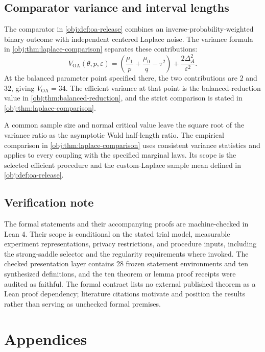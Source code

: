 \documentclass[11pt]{article}
\begin{document}
\subsection{Comparator variance and interval lengths}

The comparator in \cref{obj:def:oa-release} combines an inverse-probability-weighted binary outcome with independent centered Laplace noise. The variance formula in \cref{obj:thm:laplace-comparison} separates these contributions:
\[
V_{\mathrm{OA}}(\theta,p,\varepsilon)
=
\left(\frac{\mu_1}{p}+\frac{\mu_0}{q}-\tau^2\right)
+
\frac{2\Delta_A^2}{\varepsilon^2}.
\]
At the balanced parameter point specified there, the two contributions are \(2\) and \(32\), giving \(V_{\mathrm{OA}}=34\). The efficient variance at that point is the balanced-reduction value in \cref{obj:thm:balanced-reduction}, and the strict comparison is stated in \cref{obj:thm:laplace-comparison}.

A common sample size and normal critical value leave the square root of the variance ratio as the asymptotic Wald half-length ratio. The empirical comparison in \cref{obj:thm:laplace-comparison} uses consistent variance statistics and applies to every coupling with the specified marginal laws. Its scope is the selected efficient procedure and the custom-Laplace sample mean defined in \cref{obj:def:oa-release}.

\subsection{Verification note}

The formal statements and their accompanying proofs are machine-checked in Lean 4. Their scope is conditional on the stated trial model, measurable experiment representations, privacy restrictions, and procedure inputs, including the strong-saddle selector and the regularity requirements where invoked. The checked presentation layer contains 28 frozen statement environments and ten synthesized definitions, and the ten theorem or lemma proof receipts were audited as faithful. The formal contract lists no external published theorem as a Lean proof dependency; literature citations motivate and position the results rather than serving as unchecked formal premises.


\appendix

\section*{Appendices}
\end{document}
